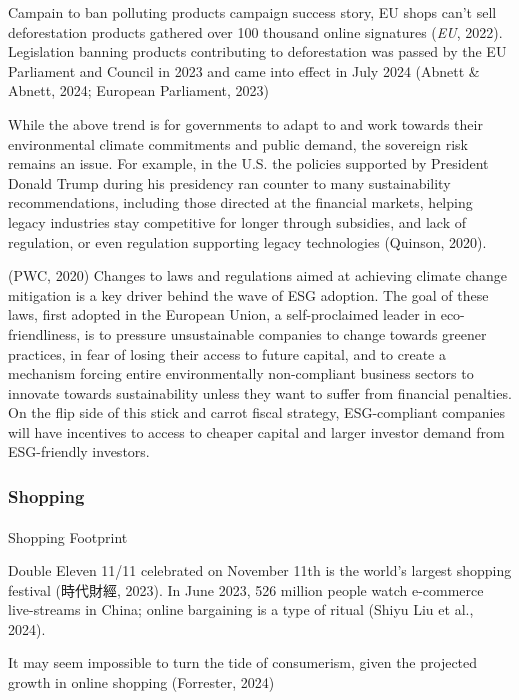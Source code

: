 \documentclass[
  letterpaper,
  DIV=11,
  numbers=noendperiod]{scrartcl}
\makeatletter
\let\oldparagraph\paragraph
\renewcommand{\paragraph}{
    \@ifstar
      \xxxParagraphStar
      \xxxParagraphNoStar
  }
\newcommand{\xxxParagraphStar}[1]{\oldparagraph*{#1}\mbox{}}
\newcommand{\xxxParagraphNoStar}[1]{\oldparagraph{#1}\mbox{}}
\makeatother
\begin{document}
Campain to ban polluting products campaign success story, EU shops can't
sell deforestation products gathered over 100 thousand online signatures
(\emph{{EU}}, 2022). Legislation banning products contributing to
deforestation was passed by the EU Parliament and Council in 2023 and
came into effect in July 2024 (Abnett \& Abnett, 2024; European
Parliament, 2023)

While the above trend is for governments to adapt to and work towards
their environmental climate commitments and public demand, the sovereign
risk remains an issue. For example, in the U.S. the policies supported
by President Donald Trump during his presidency ran counter to many
sustainability recommendations, including those directed at the
financial markets, helping legacy industries stay competitive for longer
through subsidies, and lack of regulation, or even regulation supporting
legacy technologies (Quinson, 2020).

(PWC, 2020) Changes to laws and regulations aimed at achieving climate
change mitigation is a key driver behind the wave of ESG adoption. The
goal of these laws, first adopted in the European Union, a
self-proclaimed leader in eco-friendliness, is to pressure unsustainable
companies to change towards greener practices, in fear of losing their
access to future capital, and to create a mechanism forcing entire
environmentally non-compliant business sectors to innovate towards
sustainability unless they want to suffer from financial penalties. On
the flip side of this stick and carrot fiscal strategy, ESG-compliant
companies will have incentives to access to cheaper capital and larger
investor demand from ESG-friendly investors.

\subsubsection{Shopping}\label{shopping}

\paragraph{Shopping Footprint}\label{shopping-footprint}

Double Eleven 11/11 celebrated on November 11th is the world's largest
shopping festival (時代財經, 2023). In June 2023, 526 million people
watch e-commerce live-streams in China; online bargaining is a type of
ritual (Shiyu Liu et al., 2024).

It may seem impossible to turn the tide of consumerism, given the
projected growth in online shopping (Forrester, 2024)
\end{document}
